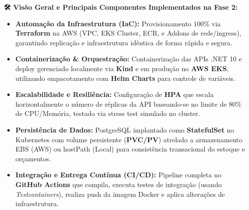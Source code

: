 \documentclass[10pt,a4paper]{article}
\begin{document}
\begin{center}
\end{center}

\vspace{0.2cm}

\begin{tcolorbox}[colback=white, colframe=borderlight, boxrule=0.5pt, arc=4pt, left=8pt, right=8pt, top=6pt, bottom=6pt]
    \small
    \textbf{\color{primary}🛠️ Visão Geral e Principais Componentes Implementados na Fase 2:}
    \vspace{0.15cm}
    \begin{itemize}
        \item \textbf{Automação da Infraestrutura (IaC):} Provisionamento 100\% via \textbf{Terraform} na AWS (VPC, EKS Cluster, ECR, e Addons de rede/ingress), garantindo replicação e infraestrutura idêntica de forma rápida e segura.
        \item \textbf{Containerização \& Orquestração:} Containerização das APIs .NET 10 e deploy gerenciado localmente via \textbf{Kind} e em produção no \textbf{AWS EKS}, utilizando empacotamento com \textbf{Helm Charts} para controle de variáveis.
        \item \textbf{Escalabilidade e Resiliência:} Configuração de \textbf{HPA} que escala horizontalmente o número de réplicas da API baseando-se no limite de 80\% de CPU/Memória, testado via stress test simulado no cluster.
        \item \textbf{Persistência de Dados:} PostgreSQL implantado como \textbf{StatefulSet} no Kubernetes com volume persistente (\textbf{PVC/PV}) atrelado a armazenamento EBS (AWS) ou hostPath (Local) para consistência transacional do estoque e orçamentos.
        \item \textbf{Integração e Entrega Contínua (CI/CD):} Pipeline completa no \textbf{GitHub Actions} que compila, executa testes de integração (usando \textit{Testcontainers}), realiza push da imagem Docker e aplica alterações de infraestrutura.
    \end{itemize}
\end{tcolorbox}
\end{document}
